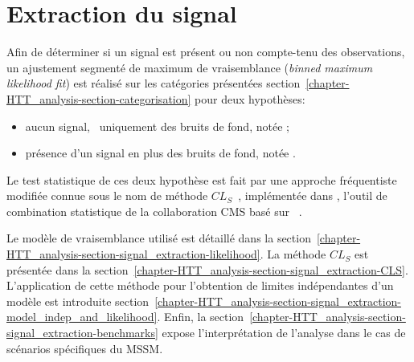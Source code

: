 \section{Extraction du signal}\label{chapter-HTT_analysis-section-signal_extraction}
Afin de déterminer si un signal est présent ou non compte-tenu des observations,
un ajustement segmenté de maximum de vraisemblance (\emph{binned maximum likelihood fit}) est réalisé sur les catégories présentées section~\ref{chapter-HTT_analysis-section-categorisation} pour deux hypothèses:
\begin{itemize}
\item aucun signal, \ie\ uniquement des bruits de fond, notée \hypB;
\item présence d'un signal en plus des bruits de fond, notée \hypSB.
\end{itemize}
Le test statistique de ces deux hypothèse est fait par une approche fréquentiste modifiée connue sous le nom de méthode $CL_S$~\cite{Junk:1999kv,CLs_method,Read_2002}, implémentée dans \COMBINE, l'outil de combination statistique de la collaboration CMS basé sur \ROOSTATS~\cite{RooStats}.
\par
Le modèle de vraisemblance utilisé est détaillé dans la section~\ref{chapter-HTT_analysis-section-signal_extraction-likelihood}.
La méthode $CL_S$ est présentée dans la section~\ref{chapter-HTT_analysis-section-signal_extraction-CLS}.
L'application de cette méthode pour l'obtention de limites indépendantes d'un modèle est introduite section~\ref{chapter-HTT_analysis-section-signal_extraction-model_indep_and_likelihood}.
Enfin, la section~\ref{chapter-HTT_analysis-section-signal_extraction-benchmarks} expose l'interprétation de l'analyse dans le cas de scénarios spécifiques du MSSM.





